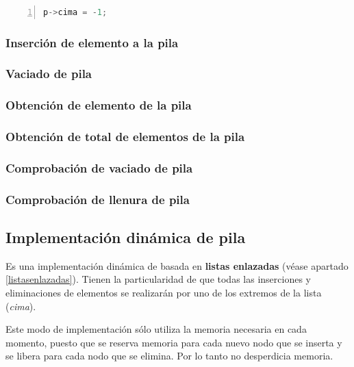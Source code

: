 \documentclass[a4paper, 11pt, titlepage]{article}
\begin{document}
            \begin{lstlisting}[language=C,numbers=left]
    p->cima = -1;\end{lstlisting}

        \subsubsection{Inserción de elemento a la pila} %

        \subsubsection{Vaciado de pila} %

        \subsubsection{Obtención de elemento de la pila} %

        \subsubsection{Obtención de total de elementos de la pila} %

        \subsubsection{Comprobación de vaciado de pila} %

        \subsubsection{Comprobación de llenura de pila} %


    \subsection{Implementación dinámica de pila}

        Es una implementación dinámica de basada en \textbf{listas enlazadas} 
        (véase apartado \ref{listasenlazadas}). Tienen la particularidad de que todas 
        las inserciones y eliminaciones de elementos se realizarán por uno de los extremos
        de la lista (\textit{cima}).

        Este modo de implementación sólo utiliza la memoria necesaria en cada momento, puesto 
        que se reserva memoria para cada nuevo nodo que se inserta y se libera para cada nodo
        que se elimina. Por lo tanto no desperdicia memoria.
\end{document}
